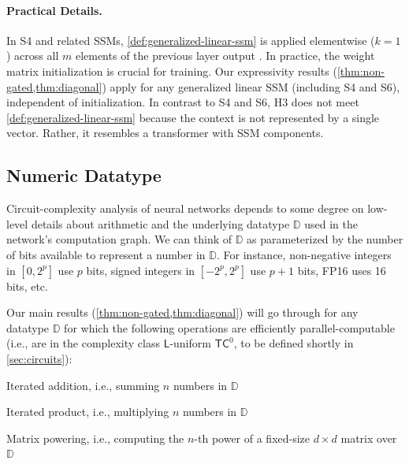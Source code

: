 \paragraph{Practical Details.} In S4 and related SSMs, \ref{def:generalized-linear-ssm} is applied elementwise ($k=1$) across all $m$ elements of the previous layer output \citep{gu2022efficiently}. In practice, the weight matrix initialization is crucial for training. Our expressivity results (\ref{thm:non-gated,thm:diagonal}) apply for any generalized linear SSM (including S4 and S6), independent of initialization. In contrast to S4 and S6, H3 \citep{fu2023hungry} does not meet \ref{def:generalized-linear-ssm} because the context is not represented by a single vector. Rather, it resembles a transformer with SSM components.

\subsection{Numeric Datatype}
\label{sec:datatype}

Circuit-complexity analysis of neural networks depends to some degree on low-level details about arithmetic and the underlying datatype $\mathbb{D}$ used in the network's computation graph. We can think of $\mathbb{D}$ as parameterized by the number of bits available to represent a number in $\mathbb{D}$. For instance, non-negative integers in $[0, 2^p]$ use $p$ bits, signed integers in $[-2^p, 2^p]$ use $p+1$ bits, FP16 uses 16 bits, etc.

Our main results (\ref{thm:non-gated,thm:diagonal}) will go through for any datatype $\mathbb{D}$ for which the following operations are efficiently parallel-computable (i.e., are in the complexity class $\mathsf{L}$-uniform $\mathsf{TC}^0$, to be defined shortly in \ref{sec:circuits}):

\begin{compactenum}
    \item Iterated addition, i.e., summing $n$ numbers in $\mathbb{D}$
    \item Iterated product, i.e., multiplying $n$ numbers in $\mathbb{D}$
    \item Matrix powering, i.e., computing the $n$-th power of a fixed-size $d \times d$ matrix over $\mathbb{D}$
\end{compactenum}


